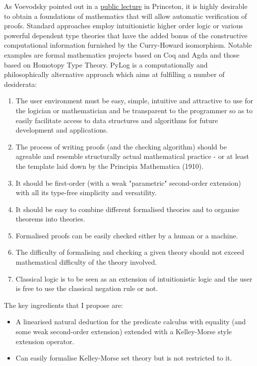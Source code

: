 \documentclass[a4paper,12pt,leqno]{article}
\numberwithin{equation}{section}
\begin{document}
 As Voevodsky pointed out in a \href{https://www.youtube.com/watch?v=E9RiR9AcXeE}{public lecture} in Princeton,
 it is highly desirable to obtain a foundations of mathematics that will allow automatic verification of proofs. Standard approaches employ intuitionistic higher order logic or various powerful dependent type theories  that have the added bonus of
 the constructive computational information furnished by the  Curry-Howard isomorphism. Notable examples
 are formal mathematics projects based on Coq and Agda and those based on Homotopy Type Theory.
 PyLog is a computationally and philosophically alternative approach which aims at fulfilling a number of desiderata:
 \begin{enumerate}
 	\item The user environment must be easy, simple, intuitive and attractive to use for the  logician or mathematician and be transparent to the programmer so as to easily facilitate access to data structures and algorithms for future development and applications.
 	\item The process of writing proofs (and the checking algorithm) should be agreable and resemble structurally actual mathematical practice - or at least the template laid down by the Principia Mathematica (1910).
 	\item It should be first-order (with a weak "parametric" second-order extension) with all its type-free simplicity and versatility.
 	\item It should be easy to combine different formalised theories and to organise theorems into theories.
 	\item Formalised proofs  can be easily checked either by a human or a machine.
 	\item The difficulty of formalising and checking a given theory should not exceed mathematical difficulty of the theory involved.
 	\item Classical logic is to be seen as an extension of intuitionistic logic and the user is free to use the classical negation rule or not.
 	
 \end{enumerate}
 
 
 The key ingredients that I propose are:
 
 \begin{itemize}
 	\item A linearised natural deduction for the predicate calculus with equality (and some weak second-order extension) extended with
 	a Kelley-Morse style extension operator.
 	\item Can easily formalise Kelley-Morse set theory but is not restricted to it.
 \end{itemize}
 
\end{document}
